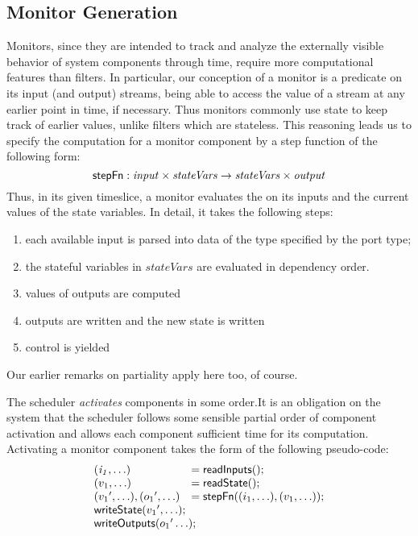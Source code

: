 {%

\subsection{Monitor Generation}

Monitors, since they are intended to track and analyze the externally
visible behavior of system components through time, require more
computational features than filters. In particular, our conception of
a monitor is a predicate on its input (and output) streams, being able
to access the value of a stream at any earlier point in time, if
necessary. Thus monitors commonly use state to keep track of earlier
values, unlike filters which are stateless. This reasoning leads us to
specify the computation for a monitor component by a step function of
the following form:
\[
\mathsf{stepFn} : \mathit{input} \times \mathit{stateVars} \to \mathit{stateVars} \times \mathit{output}
\]
Thus, in its given timeslice, a monitor evaluates the  on its inputs and the current values of the state variables. In detail, it takes the following steps:

\begin{enumerate}

\item each available input is parsed into data of the type specified
by the port type;

\item the stateful variables in $\mathit{stateVars}$  are evaluated in dependency order.

\item values of outputs are computed

\item outputs are written and the new state is written

\item control is yielded
\end{enumerate}

Our earlier remarks on partiality apply here too, of course.


The scheduler \emph{activates} components in some order.It is an
obligation on the system that the scheduler follows some sensible
partial order of component activation and allows each component
sufficient time for its computation.  Activating a monitor component
takes the form of the following pseudo-code:
\[
\begin{array}{ll}
 \mathit{(i_1,\ldots)} & = \konst{readInputs}(); \\
 (v_1,\ldots) & = \konst{readState}() ; \\
 ({v_1}',\ldots), ({o_1}',\ldots) & = \konst{stepFn} ((i_1,\ldots),(v_1,\ldots)) ; \\
 \multicolumn{2}{l}{\konst{writeState}({v_1}',\ldots);} \\
 \multicolumn{2}{l}{\konst{writeOutputs}({o_1}'\ldots);} \\
\end{array}
\]

}
